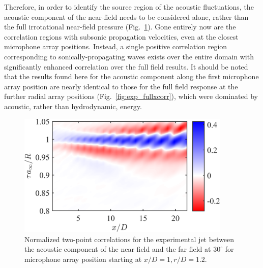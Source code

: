 \documentclass[english]{aiaa-tc}
\newcommand*{\fig}[1]{Fig.~\ref{#1}}
\begin{document}
Therefore, in order to identify the source region of the acoustic fluctuations, the acoustic component of the near-field needs to be considered alone, rather than the full irrotational near-field pressure (\fig{fig:exp_St000_acoustic}).
Gone entirely now are the correlation regions with subsonic propagation velocities, even at the closest microphone array positions.
Instead, a single positive correlation region corresponding to sonically-propagating waves exists over the entire domain with significantly enhanced correlation over the full field results.
It should be noted that the results found here for the acoustic component along the first microphone array position are nearly identical to those for the full field response at the further radial array positions (\fig{fig:exp_fullxcorr}), which were dominated by acoustic, rather than hydrodynamic, energy.
\begin{figure}
	\centering
	\includegraphics[width=4in]{figures/png/Exp/exp_St000_xcorr_acoustic.png}
	\caption{Normalized two-point correlations for the experimental jet between the acoustic component of the near field and the far field at $30^\circ$ for microphone array position starting at $x/D = 1, r/D = 1.2$. }
	\label{fig:exp_St000_acoustic}
\end{figure}
\end{document}
